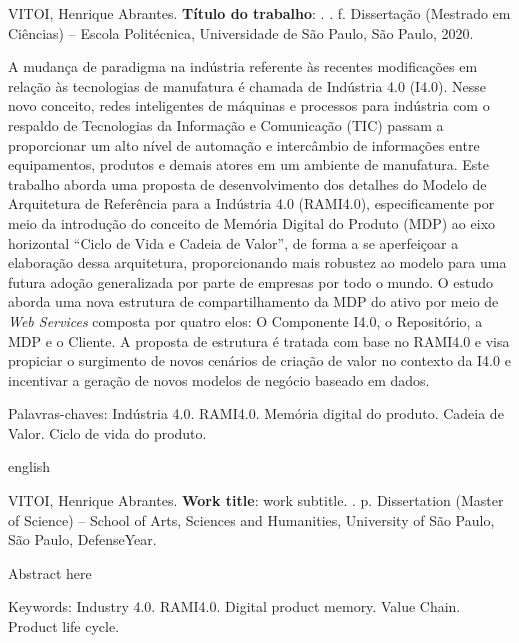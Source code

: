 \documentclass[
	12pt,				%
	oneside,			%
	a4paper,			%
	english,			%
	brazil				%
]{abntex2}
\begin{document}
\setlength{\absparsep}{18pt}	%
\begin{resumo}

	\begin{flushleft}
		VITOI, Henrique Abrantes. \textbf{Título do trabalho}: \imprimirtitulo. \imprimirdata. \pageref{LastPage} f. Dissertação (Mestrado em Ciências) – Escola Politécnica, Universidade de São Paulo, São Paulo, 2020.
	\end{flushleft}

	A mudança de paradigma na indústria referente às recentes modificações em relação às tecnologias de manufatura é chamada de Indústria 4.0 (I4.0). Nesse novo conceito, redes inteligentes de máquinas e processos para indústria com o respaldo de Tecnologias da Informação e Comunicação (TIC) passam a proporcionar um alto nível de automação e intercâmbio de informações entre equipamentos, produtos e demais atores em um ambiente de manufatura.
	Este trabalho aborda uma proposta de desenvolvimento dos detalhes do Modelo de Arquitetura de Referência para a Indústria 4.0 (RAMI4.0), especificamente por meio da introdução do conceito de Memória Digital do Produto (MDP) ao eixo horizontal ``Ciclo de Vida e Cadeia de Valor'', de forma a se aperfeiçoar a elaboração dessa arquitetura, proporcionando mais robustez ao modelo para uma futura adoção generalizada por parte de empresas por todo o mundo.
	O estudo aborda uma nova estrutura de compartilhamento da MDP do ativo por meio de \textit{Web Services} composta por quatro elos: O Componente I4.0, o Repositório, a MDP e o Cliente. A proposta de estrutura é tratada com base no RAMI4.0 e visa propiciar o surgimento de novos cenários de criação de valor no contexto da I4.0 e incentivar a geração de novos modelos de negócio baseado em dados.

	Palavras-chaves: Indústria 4.0. RAMI4.0. Memória digital do produto. Cadeia de Valor. Ciclo de vida do produto.
	
\end{resumo}

\begin{resumo}[Abstract]
	\begin{otherlanguage*}{english}

		\begin{flushleft}
			VITOI, Henrique Abrantes. \textbf{Work title}: work subtitle. \imprimirdata. \pageref{LastPage} p. Dissertation (Master of Science) – School of Arts, Sciences and Humanities, University of São Paulo, São Paulo, DefenseYear. 
		\end{flushleft}
		Abstract here

		Keywords: Industry 4.0. RAMI4.0. Digital product memory. Value Chain. Product life cycle. 
	\end{otherlanguage*}
\end{resumo}
\end{document}

